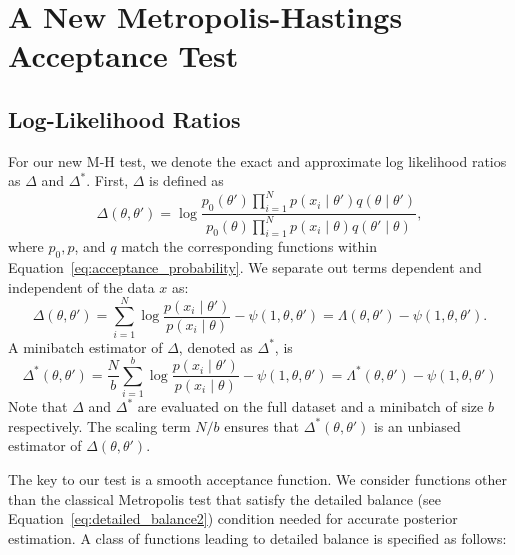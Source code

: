 \documentclass{article}
\begin{document}
\section{A New Metropolis-Hastings Acceptance Test}\label{sec:our_algorithm}

\subsection{Log-Likelihood Ratios}\label{ssec:log_likelihood_ratios}

For our new M-H test, we denote the exact and approximate log likelihood ratios
as $\Delta$ and $\Delta^*$.  First, $\Delta$ is defined as
\begin{equation}\label{eq:delta1}
    \Delta(\theta,\theta')  =
    \log \frac{p_0(\theta')\prod_{i=1}^N p(x_i \mid \theta')q(\theta \mid
    \theta')}{p_0(\theta)\prod_{i=1}^N p(x_i \mid \theta)q(\theta' \mid\theta)},
\end{equation}
where $p_0, p$, and $q$ match the corresponding functions within
Equation~\ref{eq:acceptance_probability}. We separate out terms dependent and
independent of the data $x$ as:
\begin{equation}\label{eq:delta2}
    \Delta(\theta,\theta') = \sum_{i=1}^N\log\frac{p(x_i\mid\theta')}{p(x_i\mid\theta)} - \psi(1,\theta,\theta') =
    \Lambda(\theta,\theta') - \psi(1,\theta,\theta').
\end{equation}
A minibatch estimator of $\Delta$, denoted as $\Delta^*$, is
\begin{equation}\label{eq:delta3}
    \Delta^*(\theta,\theta') =
\frac{N}{b}\sum_{i=1}^b\log\frac{p(x_i\mid\theta')}{p(x_i\mid\theta)} - \psi(1,\theta,\theta') =
\Lambda^*(\theta,\theta') - \psi(1,\theta,\theta')
\end{equation}
Note that $\Delta$ and $\Delta^*$ are evaluated on the full dataset and a
minibatch of size $b$ respectively. The scaling term $N/b$ ensures that
$\Delta^*(\theta,\theta')$ is an unbiased estimator of $\Delta(\theta,\theta')$.

The key to our test is a smooth acceptance function.  We consider functions
other than the classical Metropolis test that satisfy the detailed balance (see
Equation~\ref{eq:detailed_balance2}) condition needed for accurate posterior
estimation. A class of functions leading to detailed balance is specified as
follows:
\end{document}

